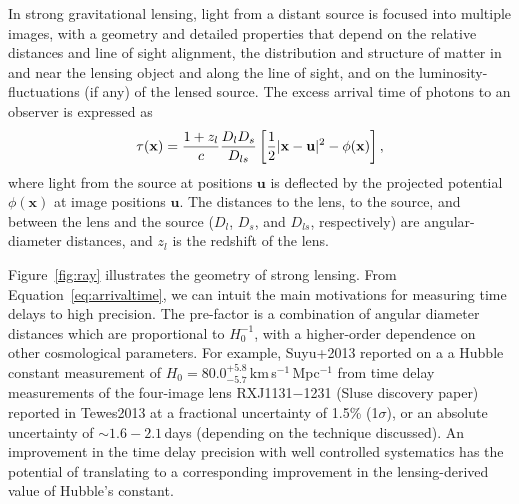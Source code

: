 \documentclass[iop]{emulateapj}
\makeatletter
\newenvironment{inlinefigure}{
\def\@captype{figure}
\noindent\begin{minipage}{0.999\linewidth}\begin{center}}
{\end{center}\end{minipage}\smallskip}
\makeatother
\begin{document}
In strong gravitational lensing, light from a distant source is
focused into multiple images, with a geometry and detailed properties
that depend on the relative distances and line of sight alignment, the
distribution and structure of matter in and near the lensing object
and along the line of sight, and on the luminosity-fluctuations (if
any) of the lensed source. The excess arrival time of photons to an
observer is expressed as
\begin{equation}
\tau({\mathbf x}) = 
{{1+z_l}\over{c}}
{{D_lD_s}\over{D_{ls}}} 
\left[
{{1}\over{2}} |{\mathbf x} - {\mathbf u}|^2 - \phi({\mathbf x})
\right], \label{eq:arrivaltime}
\end{equation}
where light from the source at positions ${\mathbf u}$ is deflected by
the projected potential $\phi({\mathbf x})$ at image positions
${\mathbf u}$. The distances to the lens, to the source, and between
the lens and the source ($D_l$, $D_s$, and $D_{ls}$, respectively) are
angular-diameter distances, and $z_l$ is the redshift of the
lens. 

\begin{inlinefigure}
\begin{center}
\end{center}
\end{inlinefigure}

Figure~\ref{fig:ray} illustrates the geometry of strong lensing. From
Equation~\ref{eq:arrivaltime}, we can intuit the main motivations for
measuring time delays to high precision.  The pre-factor is a
combination of angular diameter distances which are proportional to
$H_0^{-1}$, with a higher-order dependence on other cosmological
parameters. For example, Suyu+2013 reported on a a Hubble constant
measurement of $H_0=80.0^{+5.8}_{-5.7}$\,km\,s$^{-1}$\,Mpc$^{-1}$ from
time delay measurements of the four-image lens RXJ1131$-$1231 (Sluse
discovery paper) reported in Tewes2013 at a fractional uncertainty of
1.5\% (1$\sigma$), or an absolute uncertainty of $\sim1.6-2.1$\,days
(depending on the technique discussed).  An improvement in the time
delay precision with well controlled systematics has the potential of
translating to a corresponding improvement in the lensing-derived
value of Hubble's constant.
\end{document}
